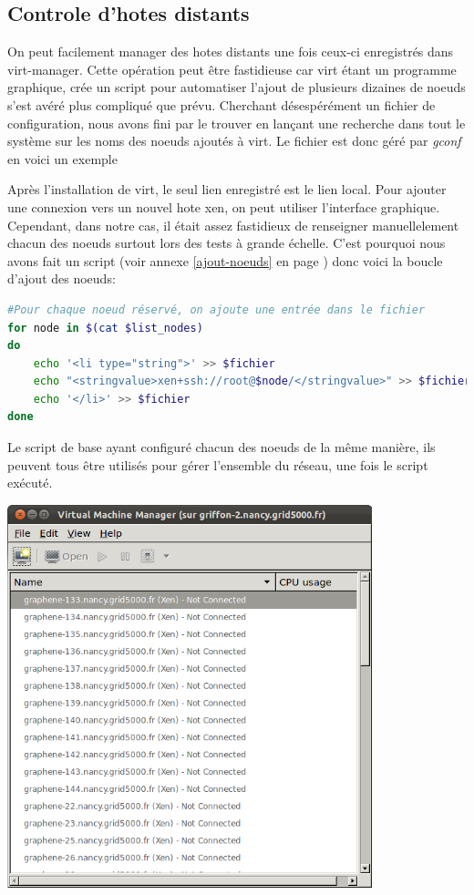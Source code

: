 \subsection{Controle d'hotes distants}
On peut facilement manager des hotes distants une fois ceux-ci enregistrés dans virt-manager. Cette opération peut être fastidieuse car virt étant un programme graphique, crée un script pour automatiser l'ajout de plusieurs dizaines de noeuds s'est avéré plus compliqué que prévu.
Cherchant désespérément un fichier de configuration, nous avons fini par le trouver en lançant une recherche dans tout le système sur les noms des noeuds ajoutés à virt. Le fichier est donc géré par \emph{gconf} en voici un exemple

Après l'installation de virt, le seul lien enregistré est le lien local. Pour ajouter une connexion vers un nouvel hote xen, on peut utiliser l'interface graphique.
Cependant, dans notre cas, il était assez fastidieux de renseigner manuellelement chacun des noeuds surtout lors des tests à grande échelle. C'est pourquoi nous avons fait un script (voir annexe \ref{ajout-noeuds} en page \pageref{ajout-noeuds}) donc voici la boucle d'ajout des noeuds:
\begin{lstlisting}[language=bash]
#Pour chaque noeud réservé, on ajoute une entrée dans le fichier
for node in $(cat $list_nodes)
do
    echo '<li type="string">' >> $fichier
    echo "<stringvalue>xen+ssh://root@$node/</stringvalue>" >> $fichier
    echo '</li>' >> $fichier
done
\end{lstlisting}
Le script de base ayant configuré chacun des noeuds de la même manière, ils peuvent tous être utilisés pour gérer l'ensemble du réseau, une fois le script exécuté.
\begin{center}
  \includegraphics[width=300pt]{images/virt-ajout_noeuds.png}
\end{center}
